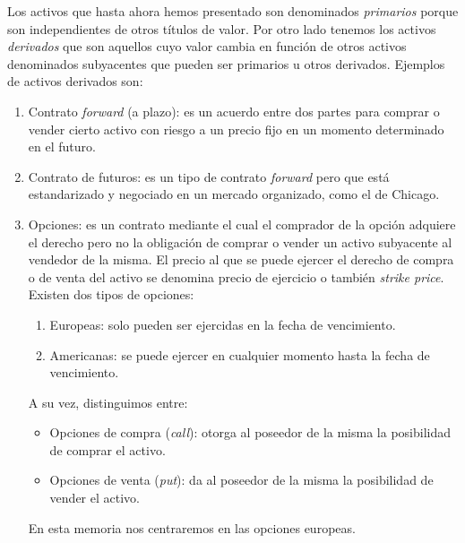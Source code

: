 Los activos que hasta ahora hemos presentado son denominados \textit{primarios} porque son independientes de otros títulos de valor. Por otro lado tenemos los activos \textit{derivados} que son aquellos cuyo valor cambia en función de otros activos denominados subyacentes que pueden ser primarios u otros derivados. Ejemplos de activos derivados son:
\begin{enumerate}
	\item Contrato \textit{forward} (a plazo): es un acuerdo entre dos partes para comprar o vender cierto activo con riesgo a un precio fijo en un momento determinado en el futuro. 
	\item Contrato de futuros: es un tipo de contrato \textit{forward} pero que está estandarizado y negociado en un mercado organizado, como el de Chicago.
	\item Opciones: es un contrato mediante el cual el comprador de la opción adquiere el derecho pero no la obligación de comprar o vender un activo subyacente al vendedor de la misma. El precio al que se puede ejercer el derecho de compra o de venta del activo se denomina precio de ejercicio o también \textit{strike price}. Existen dos tipos de opciones: 
	\begin{enumerate}
		\item Europeas: solo pueden ser ejercidas en la fecha de vencimiento.
		\item Americanas:  se puede ejercer en cualquier momento hasta la fecha de vencimiento.
	\end{enumerate}
	A su vez, distinguimos entre:
	\begin{itemize}
		\item Opciones de compra (\textit{call}): otorga al poseedor de la misma la posibilidad de comprar el activo.
		\item Opciones de venta (\textit{put}): da al poseedor de la misma la posibilidad de vender el activo.
	\end{itemize}
	
	En esta memoria nos centraremos en las opciones europeas. 
\end{enumerate} 

